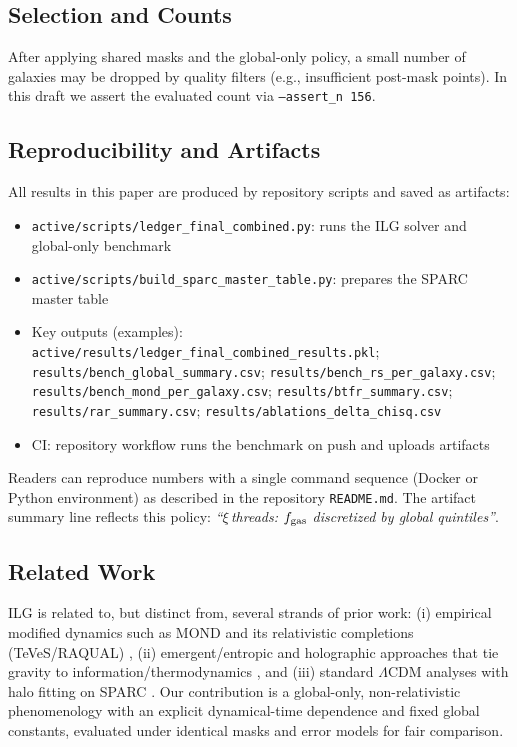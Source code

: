 \documentclass[12pt,a4paper]{article}
\begin{document}
\subsection{Selection and Counts}
\noindent After applying shared masks and the global-only policy, a small number of galaxies may be dropped by quality filters (e.g., insufficient post-mask points). In this draft we assert the evaluated count via \texttt{--assert\_n 156}.

\subsection{Reproducibility and Artifacts}

All results in this paper are produced by repository scripts and saved as artifacts:
\begin{itemize}
  \item \texttt{active/scripts/ledger\_final\_combined.py}: runs the ILG solver and global-only benchmark
  \item \texttt{active/scripts/build\_sparc\_master\_table.py}: prepares the SPARC master table
  \item Key outputs (examples): \texttt{active/results/ledger\_final\_combined\_results.pkl}; \texttt{results/bench\_global\_summary.csv}; \texttt{results/bench\_rs\_per\_galaxy.csv}; \texttt{results/bench\_mond\_per\_galaxy.csv}; \texttt{results/btfr\_summary.csv}; \texttt{results/rar\_summary.csv}; \texttt{results/ablations\_delta\_chisq.csv}
  \item CI: repository workflow runs the benchmark on push and uploads artifacts
\end{itemize}

Readers can reproduce numbers with a single command sequence (Docker or Python environment) as described in the repository \texttt{README.md}. The artifact summary line reflects this policy: \emph{``$\xi$\,threads: $f_{\rm gas}$ discretized by global quintiles''}.

\subsection{Related Work}
\noindent ILG is related to, but distinct from, several strands of prior work: (i) empirical modified dynamics such as MOND and its relativistic completions (TeVeS/RAQUAL) \citep{milgrom1983,bekenstein2004,famaey2012}, (ii) emergent/entropic and holographic approaches that tie gravity to information/thermodynamics \citep{verlinde2011,verlinde2017}, and (iii) standard $\Lambda$CDM analyses with halo fitting on SPARC \citep{li2018}. Our contribution is a global-only, non-relativistic phenomenology with an explicit dynamical-time dependence and fixed global constants, evaluated under identical masks and error models for fair comparison.
\end{document}
